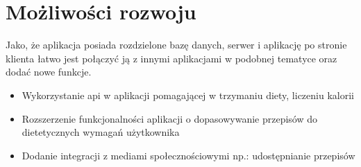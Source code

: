 \documentclass[11pt]{article}
\begin{document}
\section{Możliwości rozwoju}
Jako, że aplikacja posiada rozdzielone bazę danych, serwer i aplikację po stronie klienta łatwo jest połączyć ją z innymi aplikacjami w podobnej tematyce oraz dodać nowe funkcje.
\begin{itemize}
    \item Wykorzystanie api w aplikacji pomagającej w trzymaniu diety, liczeniu kalorii
    \item Rozszerzenie funkcjonalności aplikacji o dopasowywanie przepisów do dietetycznych wymagań użytkownika
    \item Dodanie integracji z mediami społecznościowymi np.: udostępnianie przepisów
\end{itemize}
\end{document}
